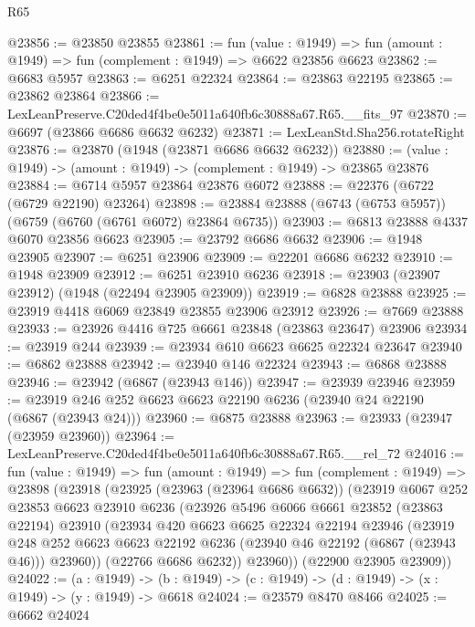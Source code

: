 \begin{lexlean}{R65}
\begin{coremodule}
{@23856 := @23850 @23855
@23861 := fun (value : @1949) =>
  fun (amount : @1949) => fun (complement : @1949) => @6622 @23856 @6623
@23862 := @6683 @5957
@23863 := @6251 @22324
@23864 := @23863 @22195
@23865 := @23862 @23864
@23866 := LexLeanPreserve.C20ded4f4be0e5011a640fb6c30888a67.R65.__fits_97
@23870 := @6697 (@23866 @6686 @6632 @6232)
@23871 := LexLeanStd.Sha256.rotateRight
@23876 := @23870 (@1948 (@23871 @6686 @6632 @6232))
@23880 := (value : @1949) -> (amount : @1949) -> (complement : @1949) -> @23865 @23876
@23884 := @6714 @5957 @23864 @23876 @6072
@23888 := @22376 (@6722 (@6729 @22190) @23264)
@23898 := @23884 @23888 (@6743 (@6753 @5957)) (@6759 (@6760 (@6761 @6072) @23864 @6735))
@23903 := @6813 @23888 @4337 @6070 @23856 @6623
@23905 := @23792 @6686 @6632
@23906 := @1948 @23905
@23907 := @6251 @23906
@23909 := @22201 @6686 @6232
@23910 := @1948 @23909
@23912 := @6251 @23910 @6236
@23918 := @23903 (@23907 @23912) (@1948 (@22494 @23905 @23909))
@23919 := @6828 @23888
@23925 := @23919 @4418 @6069 @23849 @23855 @23906 @23912
@23926 := @7669 @23888
@23933 := @23926 @4416 @725 @6661 @23848 (@23863 @23647) @23906
@23934 := @23919 @244
@23939 := @23934 @610 @6623 @6625 @22324 @23647
@23940 := @6862 @23888
@23942 := @23940 @146 @22324
@23943 := @6868 @23888
@23946 := @23942 (@6867 (@23943 @146))
@23947 := @23939 @23946
@23959 := @23919 @246 @252 @6623 @6623 @22190 @6236 (@23940 @24 @22190 (@6867 (@23943 @24)))
@23960 := @6875 @23888
@23963 := @23933 (@23947 (@23959 @23960))
@23964 := LexLeanPreserve.C20ded4f4be0e5011a640fb6c30888a67.R65.__rel_72
@24016 := fun (value : @1949) =>
  fun (amount : @1949) =>
  fun (complement : @1949) =>
  @23898
    (@23918
      (@23925
        (@23963 (@23964 @6686 @6632))
        (@23919
          @6067
          @252
          @23853
          @6623
          @23910
          @6236
          (@23926
            @5496
            @6066
            @6661
            @23852
            (@23863 @22194)
            @23910
            (@23934
              @420
              @6623
              @6625
              @22324
              @22194
              @23946
              (@23919
                @248
                @252
                @6623
                @6623
                @22192
                @6236
                (@23940 @46 @22192 (@6867 (@23943 @46)))
                @23960))
            (@22766 @6686 @6232))
          @23960))
      (@22900 @23905 @23909))
@24022 := (a : @1949) ->
  (b : @1949) -> (c : @1949) -> (d : @1949) -> (x : @1949) -> (y : @1949) -> @6618
@24024 := @23579 @8470 @8466
@24025 := @6662 @24024
}
\end{coremodule}
\end{lexlean}
